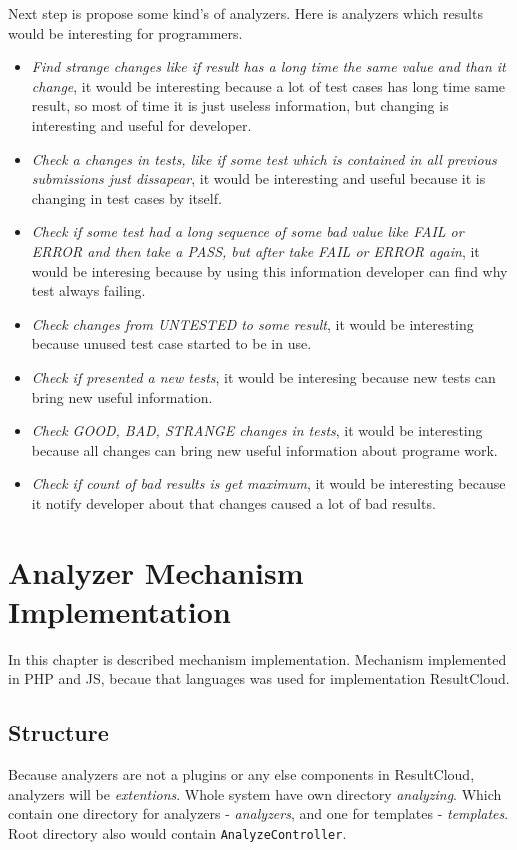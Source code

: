 Next step is propose some kind's of analyzers. Here is analyzers which results would be interesting for programmers.
\begin{itemize} 
\item \emph{Find strange changes like if result has a long time the same value and than it change}, it would be interesting because a lot of test cases has long time same result, so most of time it is just useless information, but changing is interesting and useful for developer.
\item \emph{Check a changes in tests, like if some test which is contained in all previous submissions just dissapear}, it would be interesting and useful because it is changing in test cases by itself.
\item \emph{Check if some test had a long sequence of some bad value like FAIL or ERROR and then take a PASS, but after take FAIL or ERROR again}, it would be interesing because by using this information developer can find why test always failing.
\item \emph{Check changes from UNTESTED to some result}, it would be interesting because unused test case started to be in use.
\item \emph{Check if presented a new tests}, it would be interesing because new tests can bring new useful information.
\item \emph{Check GOOD, BAD, STRANGE changes in tests}, it would be interesting because all changes can bring new useful information about programe work. 
\item \emph{Check if count of bad results is get maximum}, it would be interesting because it notify developer about that changes caused a lot of bad results.
\end{itemize}

\chapter{Analyzer Mechanism Implementation}

In this chapter is described mechanism implementation. Mechanism implemented in PHP and JS, becaue that languages was used for implementation ResultCloud.

\section{Structure}

Because analyzers are not a plugins or any else components in ResultCloud, analyzers will be \emph{extentions}. Whole system have own directory \emph{analyzing}. Which contain one directory for analyzers - \emph{analyzers}, and one for templates - \emph{templates}. Root directory also would contain \texttt{AnalyzeController}.


